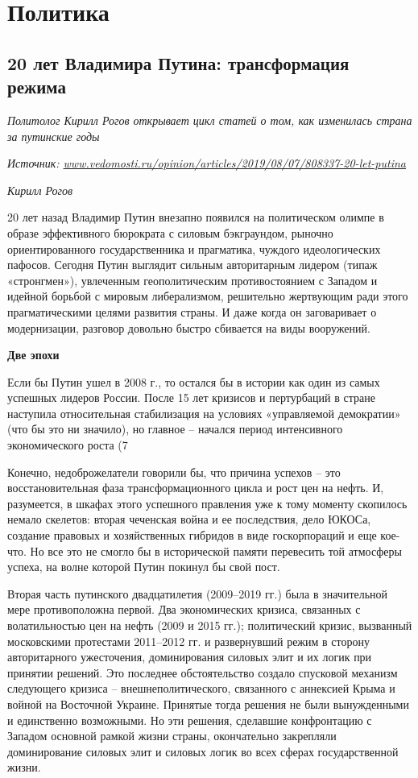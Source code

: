 \chapter{Политика}


\section{20 лет Владимира Путина: трансформация режима}

\textit{Политолог Кирилл Рогов открывает цикл статей о том, как изменилась страна за путинские годы}

\textit{Источник: \url{www.vedomosti.ru/opinion/articles/2019/08/07/808337-20-let-putina}}

\textit{Кирилл Рогов }

20 лет назад Владимир Путин внезапно появился на политическом олимпе в образе эффективного бюрократа с силовым бэкграундом, рыночно ориентированного государственника и прагматика, чуждого идеологических пафосов. Сегодня Путин выглядит сильным авторитарным лидером (типаж «стронгмен»), увлеченным геополитическим противостоянием с Западом и идейной борьбой с мировым либерализмом, решительно жертвующим ради этого прагматическими целями развития страны. И даже когда он заговаривает о модернизации, разговор довольно быстро сбивается на виды вооружений.

\textbf{Две эпохи}



Если бы Путин ушел в 2008 г., то остался бы в истории как один из самых успешных лидеров России. После 15 лет кризисов и пертурбаций в стране наступила относительная стабилизация на условиях «управляемой демократии» (что бы это ни значило), но главное – начался период интенсивного экономического роста (7%

Конечно, недоброжелатели говорили бы, что причина успехов – это восстановительная фаза трансформационного цикла и рост цен на нефть. И, разумеется, в шкафах этого успешного правления уже к тому моменту скопилось немало скелетов: вторая чеченская война и ее последствия, дело ЮКОСа, создание правовых и хозяйственных гибридов в виде госкорпораций и еще кое-что. Но все это не смогло бы в исторической памяти перевесить той атмосферы успеха, на волне которой Путин покинул бы свой пост.

Вторая часть путинского двадцатилетия (2009–2019 гг.) была в значительной мере противоположна первой. Два экономических кризиса, связанных с волатильностью цен на нефть (2009 и 2015 гг.); политический кризис, вызванный московскими протестами 2011–2012 гг. и развернувший режим в сторону авторитарного ужесточения, доминирования силовых элит и их логик при принятии решений. Это последнее обстоятельство создало спусковой механизм следующего кризиса – внешнеполитического, связанного с аннексией Крыма и войной на Восточной Украине. Принятые тогда решения не были вынужденными и единственно возможными. Но эти решения, сделавшие конфронтацию с Западом основной рамкой жизни страны, окончательно закрепляли доминирование силовых элит и силовых логик во всех сферах государственной жизни.

